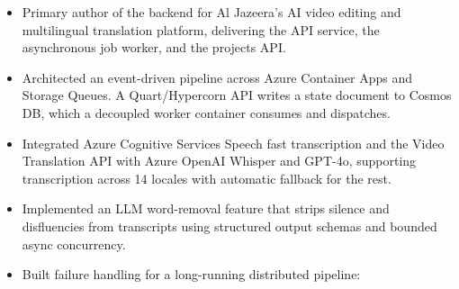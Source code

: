 \documentclass[10pt,a4paper]{article}
\begin{document}
\begin{itemize}
    \item Primary author of the backend for Al Jazeera's AI video editing and
    multilingual translation platform, delivering the API service, the
    asynchronous job worker, and the projects API.
    \item Architected an event-driven pipeline across Azure Container Apps and
    Storage Queues. A Quart/Hypercorn API writes a state document to Cosmos DB,
    which a decoupled worker container consumes and dispatches.
    \item Integrated Azure Cognitive Services Speech fast transcription and the
    Video Translation API with Azure OpenAI Whisper and GPT-4o, supporting
    transcription across 14 locales with automatic fallback for the rest.
    \item Implemented an LLM word-removal feature that strips silence and
    disfluencies from transcripts using structured output schemas and bounded
    async concurrency.
    \item Built failure handling for a long-running distributed pipeline:

\end{itemize}
\end{document}
